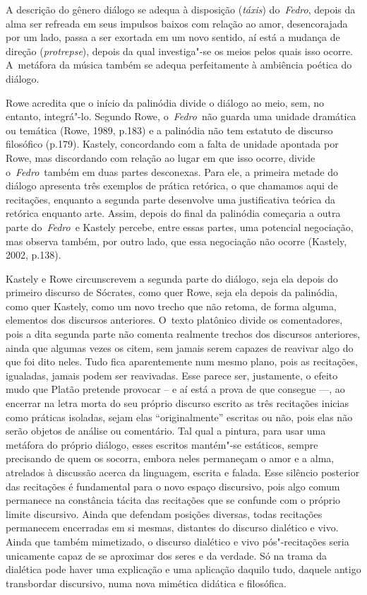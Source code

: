  

A descrição do gênero diálogo se adequa à disposição (\emph{táxis})
do~\emph{Fedro}, depois da alma ser refreada em seus impulsos baixos com
relação ao amor, desencorajada por um lado, passa a ser exortada em um
novo sentido, aí está a mudança de direção (\emph{protrepse}), depois da
qual investiga"-se os meios pelos quais isso ocorre. A~metáfora da música
também se adequa perfeitamente à ambiência poética do diálogo.

Rowe acredita que o início da palinódia divide o diálogo ao meio, sem,
no entanto, integrá"-lo. Segundo Rowe, o~\emph{Fedro}~não guarda uma
unidade dramática ou temática (Rowe, 1989, p.183) e a palinódia não tem
estatuto de discurso filosófico (p.179). Kastely, concordando com a
falta de unidade apontada por Rowe, mas discordando com relação ao lugar
em que isso ocorre, divide o~\emph{Fedro}~também em duas partes
desconexas. Para ele, a primeira metade do diálogo apresenta três
exemplos de prática retórica, o que chamamos aqui de recitações,
enquanto a segunda parte desenvolve uma justificativa teórica da
retórica enquanto arte. Assim, depois do final da palinódia começaria a
outra parte do~\emph{Fedro}~e Kastely percebe, entre essas partes, uma
potencial negociação, mas observa também, por outro lado, que essa
negociação não ocorre (Kastely, 2002, p.138).

Kastely e Rowe circunscrevem a segunda parte do diálogo, seja ela depois
do primeiro discurso de Sócrates, como quer Rowe, seja ela depois da
palinódia, como quer Kastely, como um novo trecho que não retoma, de
forma alguma, elementos dos discursos anteriores. O~texto platônico
divide os comentadores, pois a dita segunda parte não comenta realmente
trechos dos discursos anteriores, ainda que algumas vezes os citem, sem
jamais serem capazes de reavivar algo do que foi dito neles. Tudo fica
aparentemente num mesmo plano, pois as recitações, igualadas, jamais
podem ser reavivadas. Esse parece ser, justamente, o efeito mudo que
Platão pretende provocar -- e aí está a prova de que consegue \mbox{---,} ao
encerrar na letra morta do seu próprio discurso escrito as três
recitações inicias como práticas isoladas, sejam elas ``originalmente''
escritas ou não, pois elas não serão objetos de análise ou comentário.
Tal qual a pintura, para usar uma metáfora do próprio diálogo, esses
escritos mantém"-se estáticos, sempre precisando de quem os socorra,
embora neles permaneçam o amor e a alma, atrelados à discussão acerca da
linguagem, escrita e falada. Esse silêncio posterior das recitações é
fundamental para o novo espaço discursivo, pois algo comum permanece na
constância tácita das recitações que se confunde com o próprio limite
discursivo. Ainda que defendam posições diversas, todas recitações
permanecem encerradas em si mesmas, distantes do discurso dialético e
vivo. Ainda que também mimetizado, o discurso dialético e vivo
pós"-recitações seria unicamente capaz de se aproximar dos seres e da
verdade. Só na trama da dialética pode haver uma explicação e uma
aplicação daquilo tudo, daquele antigo transbordar discursivo, numa nova
mimética didática e filosófica.

